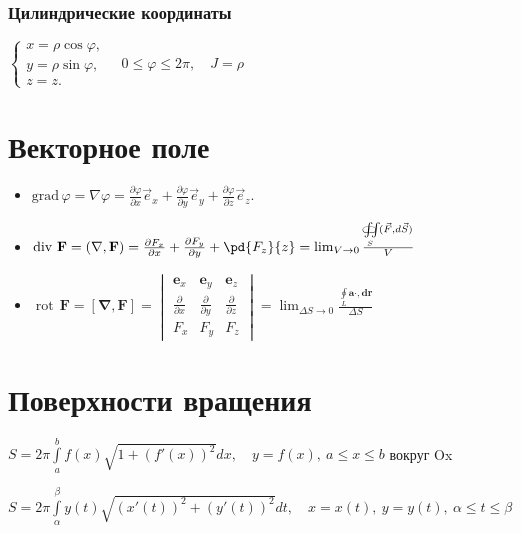 \subsubsection{Цилиндрические координаты}
${\begin{cases}x=\rho \cos \varphi ,\\y=\rho \sin \varphi ,\\z=z.\end{cases}} \quad 0 \le \varphi \le 2\pi, \quad J = \rho$


\section{Векторное поле}

\begin{itemize}
	\item
	${\mathrm  {grad}}\,\varphi =\nabla \varphi ={\frac  {\partial \varphi }{\partial x}}{\vec  e}_{x}+{\frac  {\partial \varphi }{\partial y}}{\vec  e}_{y}+{\frac  {\partial \varphi }{\partial z}}{\vec  e}_{z}.$
	
	\item
	$\operatorname {div}\,{\mathbf  {F}}= (\nabla , {\mathbf  {F}})= {\frac  {\partial F_{x}}{\partial x}}+{\frac  {\partial F_{y}}{\partial y}}+{\pd{F_{z}}{z}} = \lim _{{V\rightarrow 0}}{\frac{\iint \limits _{S}\!\!\!\!\!\!\!\!\!\!\subset \!\supset \,({\vec  F},d{\vec  S})}{V}}$
	
	\item
	$\operatorname{rot}\, \mathbf{F} = [\mathbf{\nabla} , \mathbf{F}] = \begin{vmatrix} \mathbf{e}_x & \mathbf{e}_y & \mathbf{e}_z \\  
	\frac{\partial}{\partial x} & \frac{\partial}{\partial y} & \frac{\partial}{\partial z} 
	\\  F_x & F_y & F_z 
	\end{vmatrix} 
	= \lim_{\Delta S\to 0}\frac{\oint\limits_{L}\mathbf{ a\cdot , dr}}{\Delta S}$
	
\end{itemize}

\section{Поверхности вращения}

$S=2\pi \int \limits _{a}^{b}f(x){\sqrt  {1+\left(f'(x)\right)^{2}}}dx, \quad y=f(x),\ a\leq x\leq b$ вокруг Ox

$S=2\pi \int \limits _{\alpha }^{\beta }y(t){\sqrt  {\left(x'(t)\right)^{2}+\left(y'(t)\right)^{2}}}dt, \quad x=x(t),\ y=y(t),\ \alpha \leq t\leq \beta  $

